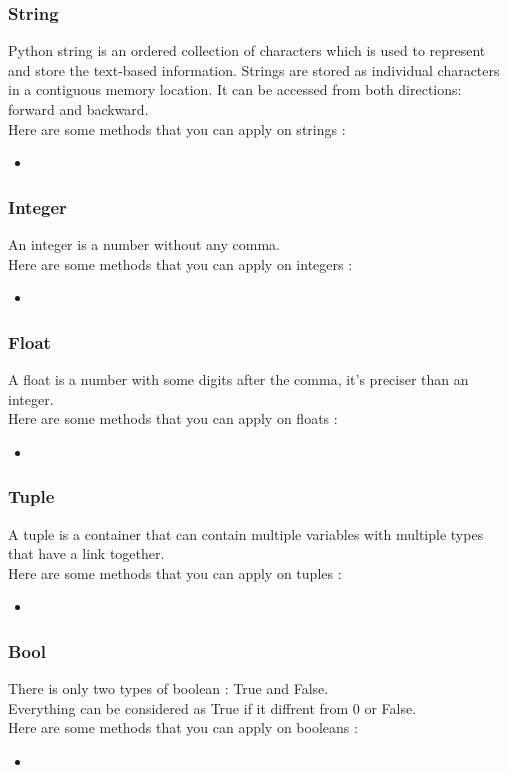 \documentclass[a4paper, 12pt]{article}
\begin{document}
\subsubsection{String}
Python string is an ordered collection of characters which is used to represent and store the text-based information. Strings are stored as individual characters in a contiguous memory location. It can be accessed from both directions: forward and backward. \\
Here are some methods that you can apply on strings : 
\begin{itemize}
\item
\end{itemize}

\subsubsection{Integer}
An integer is a number without any comma. \\
Here are some methods that you can apply on integers : 
\begin{itemize}
\item
\end{itemize}

\subsubsection{Float}
A float is a number with some digits after the comma, it's preciser than an integer. \\
Here are some methods that you can apply on floats : 
\begin{itemize}
\item
\end{itemize}

\subsubsection{Tuple}
A tuple is a container that can contain multiple variables with multiple types that have a link together. \\
Here are some methods that you can apply on tuples : 
\begin{itemize}
\item
\end{itemize}

\subsubsection{Bool}
There is only two types of boolean : True and False. \\
Everything can be considered as True if it diffrent from 0 or False. \\
Here are some methods that you can apply on booleans : 
\begin{itemize}
\item
\end{itemize}
\end{document}
